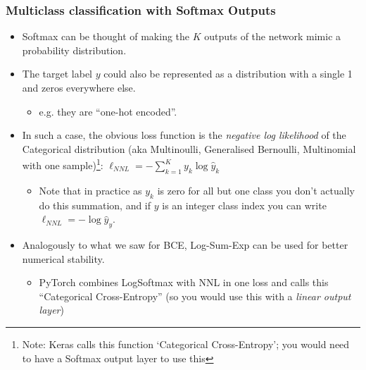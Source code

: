 \documentclass[\beamerclass]{beamer}
\begin{document}
\begin{frame}[fragile]\frametitle{Multiclass classification with Softmax Outputs}

\begin{itemize}
  \item<+-> Softmax can be thought of making the $K$ outputs of the network mimic a probability distribution.
  \item<+-> The target label $y$ could also be represented as a distribution with a single 1 and zeros everywhere else.
  \begin{itemize}
    \item e.g. they are ``one-hot encoded''.
  \end{itemize}
  \item<+-> In such a case, the obvious loss function is the \emph{negative log likelihood} of the Categorical distribution (aka Multinoulli, Generalised Bernoulli, Multinomial with one sample)\footnote{Note: Keras calls this function `Categorical Cross-Entropy'; you would need to have a Softmax output layer to use this}: $\ell_{NNL} = - \sum_{k = 1}^K y_k \log \hat y_k$
  \begin{itemize}
    \item Note that in practice as $y_k$ is zero for all but one class you don't actually do this summation, and if $y$ is an integer class index you can write $\ell_{NNL} = - \log \hat y_y$.
  \end{itemize}
  \item<+-> Analogously to what we saw for BCE, Log-Sum-Exp can be used for better numerical stability.
  \begin{itemize}
    \item PyTorch combines LogSoftmax with NNL in one loss and calls this ``Categorical Cross-Entropy'' (so you would use this with a \emph{linear output layer})
  \end{itemize}
\end{itemize}

\end{frame}
\end{document}
